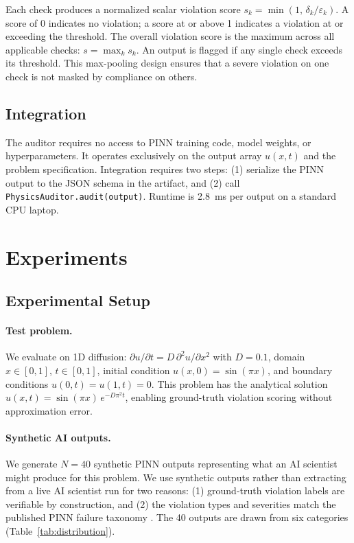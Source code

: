 \documentclass{article}
\begin{document}
Each check produces a normalized scalar violation score
$s_k = \min(1,\,\delta_k/\varepsilon_k)$.
A score of 0 indicates no violation; a score at or above 1 indicates a
violation at or exceeding the threshold.
The overall violation score is the maximum across all applicable checks:
$s = \max_k s_k$.
An output is flagged if any single check exceeds its threshold.
This max-pooling design ensures that a severe violation on one check is not
masked by compliance on others.

\subsection{Integration}

The auditor requires no access to PINN training code, model weights, or
hyperparameters.
It operates exclusively on the output array $u(x,t)$ and the problem
specification.
Integration requires two steps: (1) serialize the PINN output to the JSON
schema in the artifact, and (2) call \texttt{PhysicsAuditor.audit(output)}.
Runtime is 2.8~ms per output on a standard CPU laptop.

\section{Experiments}

\subsection{Experimental Setup}

\paragraph{Test problem.}
We evaluate on 1D diffusion: $\partial u/\partial t = D\,\partial^2 u/\partial x^2$
with $D=0.1$, domain $x\in[0,1]$, $t\in[0,1]$, initial condition
$u(x,0)=\sin(\pi x)$, and boundary conditions $u(0,t)=u(1,t)=0$.
This problem has the analytical solution
$u(x,t)=\sin(\pi x)\,e^{-D\pi^2 t}$, enabling ground-truth violation scoring
without approximation error.

\paragraph{Synthetic AI outputs.}
We generate $N=40$ synthetic PINN outputs representing what an AI scientist
might produce for this problem.
We use synthetic outputs rather than extracting from a live AI scientist run
for two reasons: (1) ground-truth violation labels are verifiable by
construction, and (2) the violation types and severities match the published
PINN failure taxonomy
\citep{Krishnapriyan2021Failures, Rathore2024Challenges}.
The 40 outputs are drawn from six categories (Table~\ref{tab:distribution}).
\end{document}
